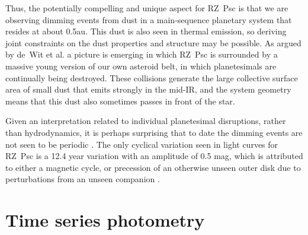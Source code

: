 \documentclass[]{rsos}
\begin{document}
Thus, the potentially compelling and unique aspect for RZ~Psc is that we are observing
dimming events from dust in a main-sequence planetary system that resides at about
0.5au. This dust is also seen in thermal emission, so deriving joint constraints on the
dust properties and structure may be possible. As argued by de~Wit et
al. \cite{2013A&A...553L...1D} a picture is emerging in which RZ~Psc is surrounded by a
massive young version of our own asteroid belt, in which planetesimals are continually
being destroyed. These collisions generate the large collective surface area of small
dust that emits strongly in the mid-IR, and the system geometry means that this dust also
sometimes passes in front of the star.

Given an interpretation related to individual planetesimal disruptions, rather than
hydrodynamics, it is perhaps surprising that to date the dimming events are not seen to
be periodic \cite{1999AstL...25..243R,2013A&A...553L...1D}. The only cyclical variation
seen in light curves for RZ~Psc is a 12.4 year variation with an amplitude of 0.5 mag,
which is attributed to either a magnetic cycle, or precession of an otherwise unseen
outer disk due to perturbations from an unseen companion \cite{2013A&A...553L...1D}.

\section{Time series photometry}\label{s:data}
\end{document}
